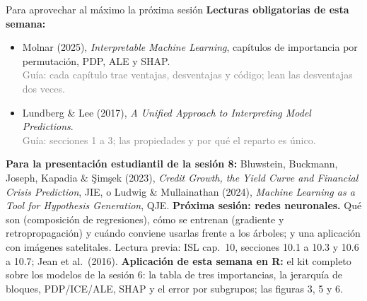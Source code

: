 \documentclass{beamer}
\newcommand{\1}{\mathbb{I}}
\begin{document}
\begin{frame}{Para aprovechar al máximo la próxima sesión}
\small
\textbf{Lecturas obligatorias de esta semana:}
\begin{itemize}\itemsep2pt
  \item Molnar (2025), \emph{Interpretable Machine Learning}, capítulos de importancia por permutación, PDP, ALE y SHAP. \\ \textcolor{gray}{Guía: cada capítulo trae ventajas, desventajas y código; lean las desventajas dos veces.}
  \item Lundberg \& Lee (2017), \emph{A Unified Approach to Interpreting Model Predictions}. \\ \textcolor{gray}{Guía: secciones 1 a 3; las propiedades y por qué el reparto es único.}
\end{itemize}
\textbf{Para la presentación estudiantil de la sesión 8:} Bluwstein, Buckmann, Joseph, Kapadia \& Şimşek (2023), \emph{Credit Growth, the Yield Curve and Financial Crisis Prediction}, JIE, o Ludwig \& Mullainathan (2024), \emph{Machine Learning as a Tool for Hypothesis Generation}, QJE.
\pause
\textbf{Próxima sesión: redes neuronales.} Qué son (composición de regresiones), cómo se entrenan (gradiente y retropropagación) y cuándo conviene usarlas frente a los árboles; y una aplicación con imágenes satelitales. Lectura previa: ISL cap.\ 10, secciones 10.1 a 10.3 y 10.6 a 10.7; Jean et al.\ (2016).
\pause
\textbf{Aplicación de esta semana en R:} el kit completo sobre los modelos de la sesión 6: la tabla de tres importancias, la jerarquía de bloques, PDP/ICE/ALE, SHAP y el error por subgrupos; las figuras 3, 5 y 6.
\end{frame}
\end{document}
